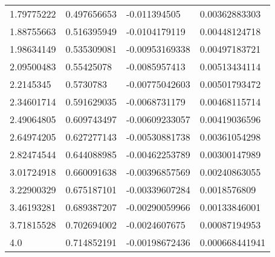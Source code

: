 \begin{longtable}{llll}
	1.79775222 & 0.497656653 & -0.011394505 & 0.00362883303 \\ 
	1.88755663 & 0.516395949 & -0.0104179119 & 0.00448124718 \\ 
	1.98634149 & 0.535309081 & -0.00953169338 & 0.00497183721 \\ 
	2.09500483 & 0.55425078 & -0.0085957413 & 0.00513434114 \\ 
	2.2145345 & 0.5730783 & -0.00775042603 & 0.00501793472 \\ 
	2.34601714 & 0.591629035 & -0.0068731179 & 0.00468115714 \\ 
	2.49064805 & 0.609743497 & -0.00609233057 & 0.00419036596 \\ 
	2.64974205 & 0.627277143 & -0.00530881738 & 0.00361054298 \\ 
	2.82474544 & 0.644088985 & -0.00462253789 & 0.00300147989 \\ 
	3.01724918 & 0.660091638 & -0.00396857569 & 0.00240863055 \\ 
	3.22900329 & 0.675187101 & -0.00339607284 & 0.0018576809 \\ 
	3.46193281 & 0.689387207 & -0.00290059966 & 0.00133846001 \\ 
	3.71815528 & 0.702694002 & -0.0024607675 & 0.00087194953 \\ 
	4.0 & 0.714852191 & -0.00198672436 & 0.000668441941 \\ 
\end{longtable}